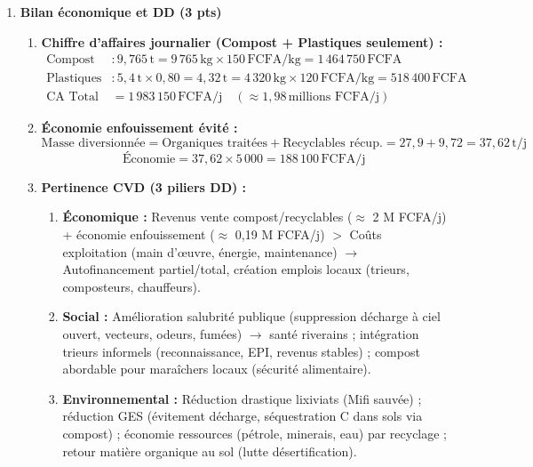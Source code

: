 \documentclass[11pt]{article}
\begin{document}
\begin{corrige}
\begin{enumerate}
    \item \textbf{Bilan économique et DD (3 pts)}
    \begin{enumerate}
        \item \textbf{Chiffre d'affaires journalier (Compost + Plastiques seulement) :}
        \begin{align*}
            \text{Compost} &: 9,765\,\text{t} = 9\,765\,\text{kg} \times 150\,\text{FCFA/kg} = 1\,464\,750\,\text{FCFA} \\
            \text{Plastiques récup.} &: 5,4\,\text{t} \times 0,80 = 4,32\,\text{t} = 4\,320\,\text{kg} \times 120\,\text{FCFA/kg} = 518\,400\,\text{FCFA} \\
            \text{CA Total} &= \boxed{1\,983\,150\,\text{FCFA/j}} \quad (\approx 1,98\,\text{millions FCFA/j})
        \end{align*}
        \item \textbf{Économie enfouissement évité :}
        \[ \text{Masse diversionnée} = \text{Organiques traitées} + \text{Recyclables récup.} = 27,9 + 9,72 = 37,62\,\text{t/j} \]
        \[ \text{Économie} = 37,62 \times 5\,000 = \boxed{188\,100\,\text{FCFA/j}} \]
        \item \textbf{Pertinence CVD (3 piliers DD) :}
        \begin{enumerate}
            \item \textbf{Économique :} Revenus vente compost/recyclables ($\approx$ 2 M FCFA/j) + économie enfouissement ($\approx$ 0,19 M FCFA/j) $>$ Coûts exploitation (main d'œuvre, énergie, maintenance) $\rightarrow$ Autofinancement partiel/total, création emplois locaux (trieurs, composteurs, chauffeurs).
            \item \textbf{Social :} Amélioration salubrité publique (suppression décharge à ciel ouvert, vecteurs, odeurs, fumées) $\rightarrow$ santé riverains ; intégration trieurs informels (reconnaissance, EPI, revenus stables) ; compost abordable pour maraîchers locaux (sécurité alimentaire).
            \item \textbf{Environnemental :} Réduction drastique lixiviats (Mifi sauvée) ; réduction GES (évitement  décharge, séquestration C dans sols via compost) ; économie ressources (pétrole, minerais, eau) par recyclage ; retour matière organique au sol (lutte désertification).
        \end{enumerate}
    \end{enumerate}


\end{enumerate}
\end{corrige}
\end{document}

